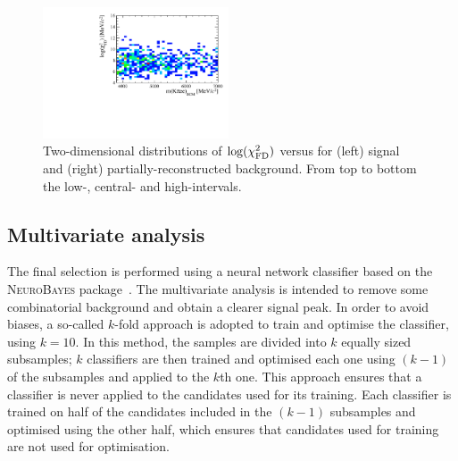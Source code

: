 \begin{figure}[t!]
\includegraphics[width=0.49\textwidth]{RKst/figs/HOP/HOP_bkg_high.pdf}
\caption{Two-dimensional distributions of $\log(\chi^2_{\rm FD})$ versus \mbcm for (left) 
\mbox{\BdToKstee} signal and (right) partially-reconstructed background.
From top to bottom the low-, central- and high-\qsq intervals.}
\label{fig:hop}

\end{figure}


\subsection{Multivariate analysis}
\label{sec:RKst_mva}

The final selection is performed using a neural network classifier based on the \mbox{\textsc{NeuroBayes}}
package~\cite{Feindt:2006pm,feindt-2004}. The multivariate analysis is intended to remove
some combinatorial background and obtain a clearer signal peak. In order to avoid biases, a so-called $k$-fold
approach is adopted to train and optimise the classifier, using $k=10$. In this method, the samples are divided into 
$k$ equally sized subsamples; $k$ classifiers are then trained and optimised each one using $(k-1)$ of the subsamples 
and applied to the $k$th one. This approach ensures that a classifier is never applied to the candidates used for its training.
Each classifier is trained on half of the candidates included in the $(k-1)$ subsamples and optimised using the other half,
which ensures that candidates used for training are not used for optimisation.

